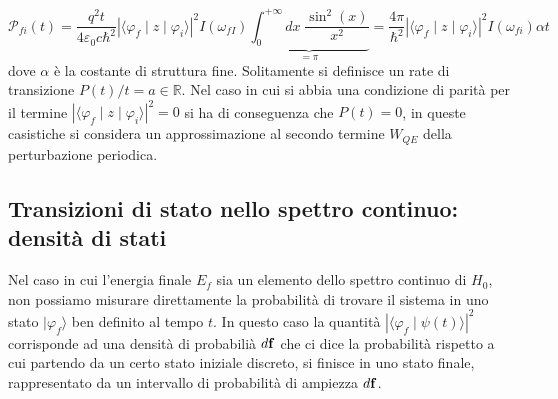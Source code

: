 \begin{equation}
 \mathcal{P}_{fi}(t) = \frac{q^2t}{4 \varepsilon_0 c \hbar^2}|\langle \varphi_{f} \mid z \mid \varphi_i \rangle|^2 I(\omega_{fI}) \underbrace{\int_{0}^{+\infty} dx \; \frac{\sin^2(x)}{x^2}}_{= \pi} =  \frac{4 \pi}{\hbar^2}|\langle \varphi_{f} \mid z \mid \varphi_i \rangle|^2 I(\omega_{fi}) \alpha t
\end{equation}
dove $\alpha $ \`e la costante di struttura fine. Solitamente si definisce un rate di transizione $P(t)/t = a \in \mathbb{R}$. Nel caso in cui si abbia una condizione di parit\`a per il termine $|\langle \varphi_{f} \mid z \mid \varphi_i \rangle|^2 = 0$ si ha di conseguenza che $P(t) = 0$, in queste casistiche si considera un approssimazione al secondo termine $W_{QE}$ della perturbazione periodica.

\subsection{Transizioni di stato nello spettro continuo: densit\`a di stati}
Nel caso in cui l'energia finale $E_f $ sia	 un elemento dello spettro continuo di $H_0$, non possiamo misurare direttamente la probabilit\`a di trovare il sistema in uno stato $|\varphi_f \rangle $ ben definito al tempo $t$. In questo caso la quantit\`a $|\langle \varphi_f \mid \psi(t) \rangle |^2$ corrisponde ad una densit\`a di probabili\`a $d \bold{f}$ che ci dice la probabilit\`a rispetto a cui partendo da un certo stato iniziale discreto, si finisce in uno stato finale, rappresentato da un intervallo di probabilit\`a di ampiezza $d\bold{f}$.


